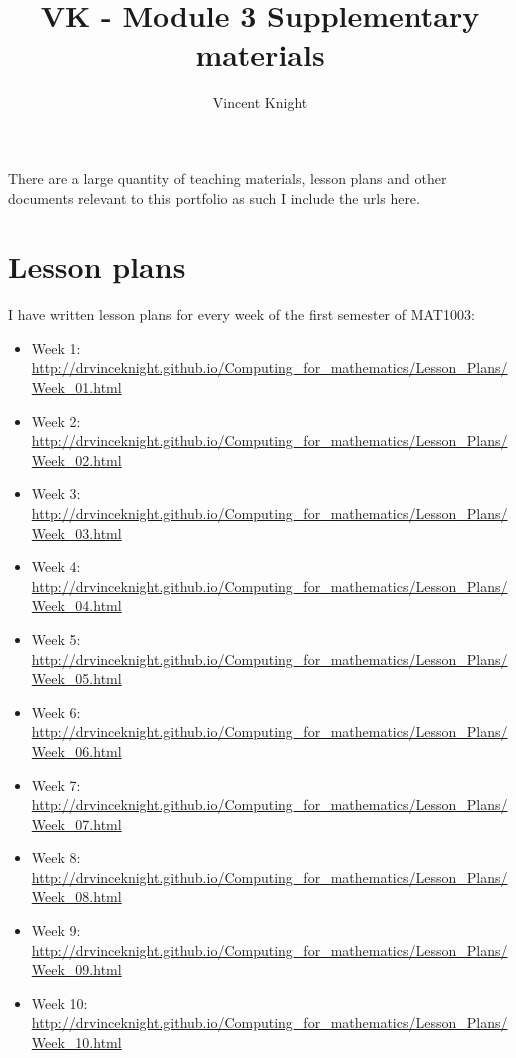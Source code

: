\documentclass{article}
\title{VK - Module 3 Supplementary materials}
\author{Vincent Knight}
\date{}
\begin{document}
\maketitle


There are a large quantity of teaching materials, lesson plans and other documents relevant to this portfolio as such I include the urls here.

\section{Lesson plans}

I have written lesson plans for every week of the first semester of MAT1003:

\begin{itemize}
    \item Week 1: \url{http://drvinceknight.github.io/Computing_for_mathematics/Lesson_Plans/Week_01.html}
    \item Week 2: \url{http://drvinceknight.github.io/Computing_for_mathematics/Lesson_Plans/Week_02.html}

    \item Week 3: \url{http://drvinceknight.github.io/Computing_for_mathematics/Lesson_Plans/Week_03.html}

    \item Week 4: \url{http://drvinceknight.github.io/Computing_for_mathematics/Lesson_Plans/Week_04.html}

    \item Week 5: \url{http://drvinceknight.github.io/Computing_for_mathematics/Lesson_Plans/Week_05.html}

    \item Week 6: \url{http://drvinceknight.github.io/Computing_for_mathematics/Lesson_Plans/Week_06.html}

    \item Week 7: \url{http://drvinceknight.github.io/Computing_for_mathematics/Lesson_Plans/Week_07.html}

    \item Week 8: \url{http://drvinceknight.github.io/Computing_for_mathematics/Lesson_Plans/Week_08.html}

    \item Week 9: \url{http://drvinceknight.github.io/Computing_for_mathematics/Lesson_Plans/Week_09.html}

    \item Week 10: \url{http://drvinceknight.github.io/Computing_for_mathematics/Lesson_Plans/Week_10.html}

\end{itemize}
\end{document}

